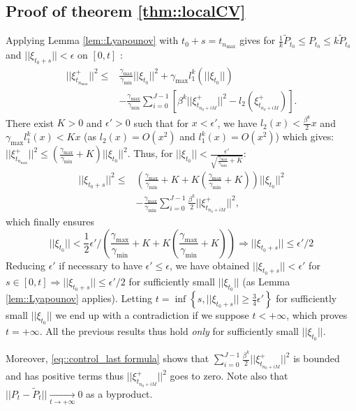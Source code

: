 \documentclass[a4paper,12pt,onecolumn]{article}
\begin{document}
\subsection{Proof of theorem \ref{thm::localCV}}
Applying Lemma \ref{lem::Lyapounov} with $t_0+s=t_{n_{\max}}$ gives for $\frac{1}{k} \tilde{P}_{t_0} \leq P_{t_0} \leq k \tilde{P}_{t_0}$ and $||\xi_{t_0+s}|| < \epsilon$ on $[0,t]$ :
\begin{align*}
|| \xi_{t_{n_{\max}}}^+ ||^2 \leq & \frac{\gamma_{\max}}{\gamma_{\min}} || \xi_{t_0} ||^2 + \gamma_{\max} l_1^{k} (||\xi_{t_0}||)  \\
 & -\frac{\gamma_{\max}}{\gamma_{\min}} \sum_{i=0}^{J-1} \left[ \beta^k ||\xi_{t_{n_0+iM}}^+||^2 - l_2(\xi_{t_{n_0+iM}}^+) \right].
\end{align*}
There exist $K>0$ and $\epsilon'>0$ such that for $x < \epsilon'$, we have $l_2(x) < \frac{\beta^k}{2} x$ and $ \gamma_{\max} l_1^{k} (x) < Kx$ (as $l_2(x) = O(x^2)$ and $l_1^k(x) = O(x^2)$) which gives:
$
|| \xi_{t_{n_{\max}}}^+ ||^2 \leq \left( \frac{\gamma_{\max}}{\gamma_{\min}} + K \right) || \xi_{t_0} ||^2.
$
Thus, for $|| \xi_{t_0} || < \frac{\epsilon'}{\sqrt{\frac{\gamma_{\max}}{\gamma_{\min}}+K}}$:
\begin{align}
|| \xi_{t_0+s} ||^2 \leq & \left( \frac{\gamma_{\max}}{\gamma_{\min}} + K + K \left( \frac{\gamma_{\max}}{\gamma_{\min}} + K \right) \right) || \xi_{t_0} ||^2 \nonumber \\
 & -\frac{\gamma_{\max}}{\gamma_{\min}}  \sum_{i=0}^{J-1} \frac{\beta^k}{2} ||\xi_{t_{n_0+iM}}^+||^2,
\label{eq::control_last formula}
\end{align}
which finally ensures
$$||\xi_{t_0}|| < \frac{1}{2} \epsilon' / \left( \frac{\gamma_{\max}}{\gamma_{\min}} + K + K \left( \frac{\gamma_{\max}}{\gamma_{\min}} + K \right) \right)\Rightarrow||\xi_{t_0+s}||\leq\epsilon'/2$$Reducing $\epsilon'$ if necessary to have $\epsilon'\leq\epsilon$, we have obtained $||\xi_{t_0+s}|| < \epsilon'$ for $s\in[0,t]\Rightarrow||\xi_{t_0+s}||\leq\epsilon'/2$ for sufficiently small $||\xi_{t_0}||$ (as Lemma \ref{lem::Lyapounov} applies).   Letting $t=\inf \left\lbrace s ,||\xi_{t_0+s}|| \geq \frac{3}{4}\epsilon'\right\rbrace$ for sufficiently small $||\xi_{t_0}||$ we end up with a contradiction if we suppose $t< + \infty$, which proves $t= + \infty$. All the previous results thus hold \emph{only} for sufficiently small $||\xi_{t_0}||$. 


Moreover, \eqref{eq::control_last formula} shows that $\sum_{i=0}^{J-1} \frac{\beta^k}{2} ||\xi_{t_{n_0+iM}}^+||^2 $ is bounded and has positive terms thus $ || \xi_{t_{n_0+iM}}^+ ||^2$ goes to zero. Note also that $||P_t - \tilde{P}_t || \underset{t \rightarrow + \infty}{\longrightarrow} 0$ as a byproduct.
\end{document}
